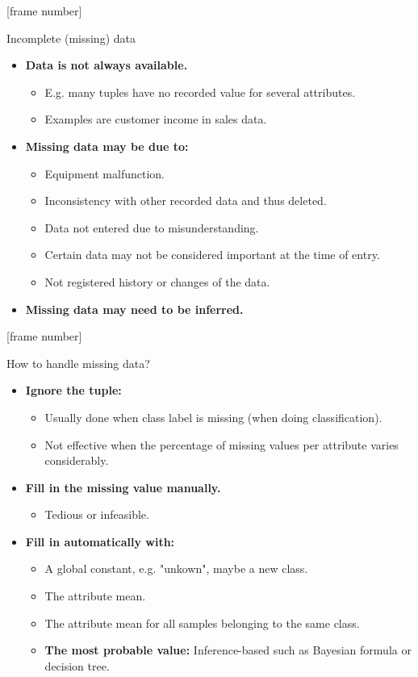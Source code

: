 \documentclass[aspectratio=169,t]{beamer}
\begin{document}
  {
    [frame number]
    \begin{frame}{Incomplete (missing) data}
    \begin{itemize}
      \item \textbf{Data is not always available.}
      \begin{itemize}
        \item E.g. many tuples have no recorded value for several attributes.
        \item Examples are customer income in sales data.
      \end{itemize}
      \item \textbf{Missing data may be due to:}
      \begin{itemize}
        \item Equipment malfunction.
        \item Inconsistency with other recorded data and thus deleted.
        \item Data not entered due to misunderstanding.
        \item Certain data may not be considered important at the time of entry.
        \item Not registered history or changes of the data.
      \end{itemize}
      \item \textbf{Missing data may need to be inferred.}
    \end{itemize}
    \end{frame}
  }

  {
    [frame number]
    \begin{frame}{How to handle missing data?}
    \begin{itemize}
      \item \textbf{Ignore the tuple:}
      \begin{itemize}
        \item Usually done when class label is missing (when doing classification).
        \item Not effective when the percentage of missing values per attribute varies considerably.
      \end{itemize}
      \item \textbf{Fill in the missing value manually.}
      \begin{itemize}
        \item Tedious or infeasible.
      \end{itemize}
      \item \textbf{Fill in automatically with:}
      \begin{itemize}
        \item A global constant, e.g. "unkown", maybe a new class.
        \item The attribute mean.
        \item The attribute mean for all samples belonging to the same class.
        \item \textbf{\color{airforceblue} The most probable value:} Inference-based such as Bayesian formula or decision tree.
      \end{itemize}
    \end{itemize}
    \end{frame}
  }
\end{document}

